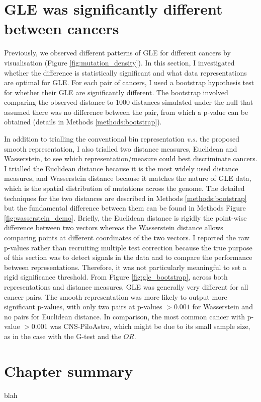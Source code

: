
\newpage

\section{GLE was significantly different between cancers}\label{gle:bootstrap}
Previously, we observed different patterns of GLE for different cancers by visualisation (Figure \ref{fig:mutation_density}). In this section, I investigated whether the difference is statistically significant and what data representations are optimal for GLE. For each pair of cancers, I used a bootstrap hypothesis test for whether their GLE are significantly different. The bootstrap involved comparing the observed distance to 1000 distances simulated under the null that assumed there was no difference between the pair, from which a p-value can be obtained (details in Methods \ref{methods:bootstrap}).

In addition to trialling the conventional bin representation \textit{v.s.} the proposed smooth representation, I also trialled two distance measures, Euclidean and Wasserstein, to see which representation/measure could best discriminate cancers. I trialled the Euclidean distance because it is the most widely used distance measures, and Wasserstein distance because it matches the nature of GLE data, which is the spatial distribution of mutations across the genome. The detailed techniques for the two distances are described in Methods \ref{methods:bootstrap} but the fundamental difference between them can be found in Methods Figure \ref{fig:wasserstein_demo}. Briefly, the Euclidean distance is rigidly the point-wise difference between two vectors whereas the Wasserstein distance allows comparing points at different coordinates of the two vectors. I reported the raw p-values rather than recruiting multiple test correction because the true purpose of this section was to detect signals in the data and to compare the performance between representations. Therefore, it was not particularly meaningful to set a rigid significance threshold. From Figure \ref{fig:gle_bootstrap}, across both representations and distance measures, GLE was generally very different for all cancer pairs. The smooth representation was more likely to output more significant p-values, with only two pairs at p-values $>0.001$ for Wasserstein and no pairs for Euclidean distance. In comparison, the most common cancer with p-value $>0.001$ was CNS-PiloAstro, which might be due to its small sample size, as in the case with the G-test and the $OR$. 



\section{Chapter summary}
blah
